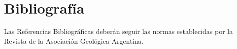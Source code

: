 \chapter*{Bibliografía}
Las Referencias Bibliográficas deberán seguir las normas establecidas por la Revista de la Asociación Geológica Argentina. 
